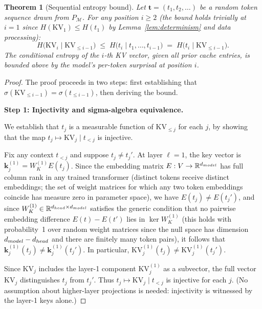 \documentclass[10pt,a4paper]{amsart}
\newtheorem{theorem}{Theorem}
\begin{document}
\begin{theorem}[Sequential entropy bound]
\label{thm:seq_bound}
Let $\mathbf{t} = (t_1, t_2, \ldots)$ be a random token sequence drawn from
$P_{\mathcal{M}}$.  For any position $i \geq 2$ (the bound holds trivially at $i=1$ since
$H(\mathrm{KV}_1) \leq H(t_1)$ by Lemma~\ref{lem:determinism} and data processing):
\[
  H\bigl(\mathrm{KV}_i \mid \mathrm{KV}_{\leq i-1}\bigr)
  \;\leq\;
  H\bigl(t_i \mid t_1, \ldots, t_{i-1}\bigr)
  \;=\;
  H\bigl(t_i \mid \mathrm{KV}_{\leq i-1}\bigr).
\]
The conditional entropy of the $i$-th KV vector, given all prior cache entries,
is bounded above by the model's per-token surprisal at position $i$.
\end{theorem}

\begin{proof}
The proof proceeds in two steps: first establishing that $\sigma(\mathrm{KV}_{\leq i-1}) = \sigma(t_{\leq i-1})$, then deriving the bound.

\textbf{Step 1: Injectivity and sigma-algebra equivalence.}

We establish that $t_j$ is a measurable function of $\mathrm{KV}_{\leq j}$ for
each $j$, by showing that the map $t_j \mapsto \mathrm{KV}_j \mid t_{<j}$ is
injective.

Fix any context $t_{<j}$ and suppose $t_j \neq t_j'$.  At layer $\ell = 1$,
the key vector is $\mathbf{k}^{(1)}_j = W_K^{(1)} E(t_j)$.  Since the
embedding matrix $E: V \to \mathbb{R}^{d_{\rm model}}$ has full column rank
in any trained transformer (distinct tokens receive distinct embeddings; the
set of weight matrices for which any two token embeddings coincide has measure
zero in parameter space), we have $E(t_j) \neq E(t_j')$, and since
$W_K^{(1)} \in \mathbb{R}^{d_{\rm head} \times d_{\rm model}}$ satisfies the generic condition that no pairwise embedding difference $E(t) - E(t')$ lies in $\ker W_K^{(1)}$ (this holds with probability~1 over random weight matrices since the null space has dimension $d_{\rm model} - d_{\rm head}$ and there are finitely many token pairs), it follows that
$\mathbf{k}^{(1)}_j(t_j) \neq \mathbf{k}^{(1)}_j(t_j')$.  In particular,
$\mathrm{KV}_j^{(1)}(t_j) \neq \mathrm{KV}_j^{(1)}(t_j')$.

Since $\mathrm{KV}_j$ includes the layer-1 component $\mathrm{KV}_j^{(1)}$
as a subvector, the full vector $\mathrm{KV}_j$ distinguishes $t_j$ from $t_j'$.
Thus $t_j \mapsto \mathrm{KV}_j \mid t_{<j}$ is injective for each $j$.
(No assumption about higher-layer projections is needed: injectivity is
witnessed by the layer-1 keys alone.)


\end{proof}
\end{document}
